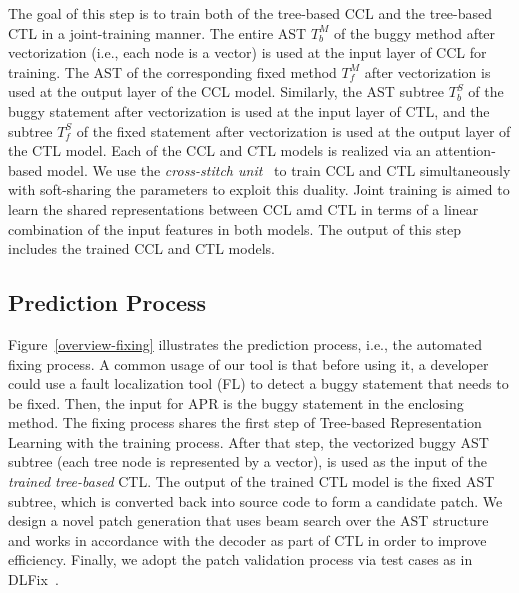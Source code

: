 \vspace{3pt}
  The goal of this step is to train both of the tree-based
CCL and the tree-based CTL in a joint-training manner. The entire AST
$T^{M}_b$ of the buggy method after vectorization (i.e., each node is
a vector) is used at the input layer of CCL for training. The AST of
the corresponding fixed method $T^{M}_f$ after vectorization is used
at the output layer of the CCL model. Similarly, the AST subtree
$T^{S}_b$ of the buggy statement after vectorization is used at the
input layer of CTL, and the subtree $T^{S}_f$ of the fixed statement
after vectorization is used at the output layer of the CTL model. Each
of the CCL and CTL models is realized via an attention-based
 model.
We use the {\em cross-stitch unit}~\cite{misra2016cross} to train CCL
and CTL simultaneously with soft-sharing the parameters to exploit
this duality. Joint training is aimed to learn the shared
representations between CCL amd CTL in terms of a linear combination
of the input features in both models. The output of this step includes
the trained CCL and CTL models.

\subsection{Prediction Process}



Figure~\ref{overview-fixing} illustrates the prediction process, i.e.,
the automated fixing process. A common usage of our tool is that
before using it, a developer could use a fault localization tool
(FL) to detect a buggy statement that needs to be fixed. Then, the
input for APR is the buggy statement in the enclosing method.
The fixing process shares the first step of Tree-based Representation
Learning with the training process. After that step, the vectorized
buggy AST subtree (each tree node is represented by a vector), is used
as the input of the {\em trained tree-based} CTL. The output of the
trained CTL model is the fixed AST subtree, which is converted back
into source code to form a candidate patch. We design a novel patch
generation that uses beam search over the AST structure and works in
accordance with the decoder as part of CTL in order to improve
efficiency. Finally, we adopt the patch validation process via test
cases as in DLFix~\cite{icse20}.

